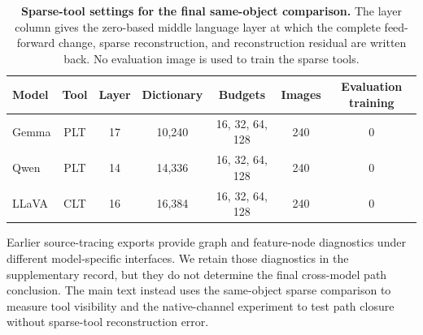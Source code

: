 \begin{table}[htbp]
\centering
\small
\caption{\textbf{Sparse-tool settings for the final same-object comparison.} The layer column gives the zero-based middle language layer at which the complete feed-forward change, sparse reconstruction, and reconstruction residual are written back. No evaluation image is used to train the sparse tools.}
\label{tab:sparse-lens-repro}
\begin{tabular*}{\linewidth}{@{\extracolsep{\fill}}lcccccc@{}}
\toprule
Model & Tool & Layer & Dictionary & Budgets & Images & Evaluation training \\
\midrule
Gemma & PLT & 17 & 10,240 & 16, 32, 64, 128 & 240 & 0 \\
Qwen & PLT & 14 & 14,336 & 16, 32, 64, 128 & 240 & 0 \\
LLaVA & CLT & 16 & 16,384 & 16, 32, 64, 128 & 240 & 0 \\
\bottomrule
\end{tabular*}
\end{table}

Earlier source-tracing exports provide graph and feature-node diagnostics under different model-specific interfaces. We retain those diagnostics in the supplementary record, but they do not determine the final cross-model path conclusion. The main text instead uses the same-object sparse comparison to measure tool visibility and the native-channel experiment to test path closure without sparse-tool reconstruction error.
